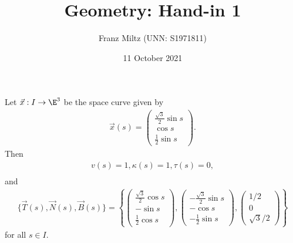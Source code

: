 \documentclass{article}
\begin{document}
\title{Geometry: Hand-in 1}
\author{Franz Miltz (UNN: S1971811)}
\date{11 October 2021}
\maketitle

\begin{claim*}[Question 1]
   Let $\vec x: I\to \E^3$ be the space curve given by
   \begin{align*}
      \vec x(s) = \begin{pmatrix}
         \frac{\sqrt{3}}{2}\sin s\\
         \cos s\\
         \frac{1}{2}\sin s
      \end{pmatrix}.
   \end{align*}
   Then
   \begin{align*}
      v(s) = 1, \kappa(s) = 1, \tau(s) = 0,\\
   \end{align*}
   and
   \begin{align*}
      \{\vec T(s), \vec N(s), \vec B(s)\} = 
      \left\lbrace  \begin{pmatrix}
         \frac{\sqrt{3}}{2}\cos s\\
         - \sin s\\
         \frac{1}{2}\cos s
      \end{pmatrix}, \begin{pmatrix}
         -\frac{\sqrt{3}}{2}\sin s\\
         - \cos s\\
         -\frac{1}{2}\sin s
      \end{pmatrix}, \begin{pmatrix}
         1/2\\ 0 \\ \sqrt{3}/2
      \end{pmatrix}
      \right\rbrace
   \end{align*}
   for all $s\in I$.
\end{claim*}
\end{document}
